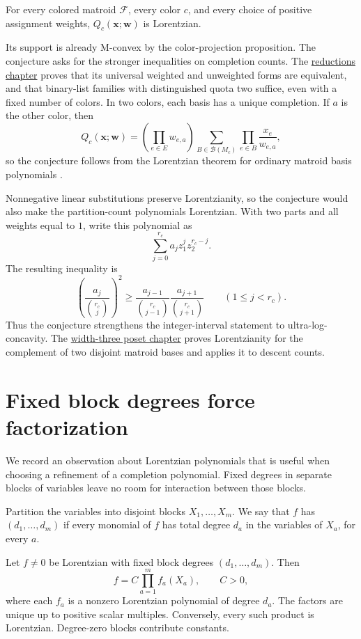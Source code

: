 \begin{conjecture}
For every colored matroid $\mathcal F$, every color $c$, and every choice
of positive assignment weights, $Q_c(\mathbf x;\mathbf w)$ is Lorentzian.
\end{conjecture}

Its support is already M-convex by the color-projection proposition.
The conjecture asks for the stronger inequalities on completion counts.
The \href{reductions.htm}{reductions chapter} proves that its universal
weighted and unweighted forms are equivalent, and that binary-list
families with distinguished quota two suffice, even with a fixed number
of colors.
In two colors, each basis has a unique completion. If $a$ is the other
color, then
\[
 Q_c(\mathbf x;\mathbf w)=
 \left(\prod_{e\in E}w_{e,a}\right)
 \sum_{B\in\mathcal B(M_c)}\prod_{e\in B}\frac{x_e}{w_{e,a}},
\]
so the conjecture follows from the Lorentzian theorem for ordinary
matroid basis polynomials \cite{BrandenHuh2020}.

Nonnegative linear substitutions preserve Lorentzianity, so the conjecture
would also make the partition-count polynomials Lorentzian. With two parts
and all weights equal to $1$, write this polynomial as
\[
 \sum_{j=0}^{r_c}a_j z_1^jz_2^{r_c-j}.
\]
The resulting inequality is
\[
 \left(\frac{a_j}{\binom{r_c}{j}}\right)^2\geq
 \frac{a_{j-1}}{\binom{r_c}{j-1}}
 \frac{a_{j+1}}{\binom{r_c}{j+1}}
 \qquad(1\leq j<r_c).
\]
Thus the conjecture strengthens the integer-interval statement to
ultra-log-concavity. The \href{log-concavity.htm}{width-three poset chapter}
proves Lorentzianity for the complement of two disjoint matroid bases and
applies it to descent counts.

\section[blockFactorization]{Fixed block degrees force factorization}

We record an observation about Lorentzian polynomials that is useful when
choosing a refinement of a completion polynomial. Fixed degrees in separate
blocks of variables leave no room for interaction between those blocks.

Partition the variables into disjoint blocks $X_1,\dotsc,X_m$. We say that
$f$ has  $(d_1,\dotsc,d_m)$ if every monomial
of $f$ has total degree $d_a$ in the variables of $X_a$, for every $a$.

\begin{theorem}
Let $f\ne0$ be Lorentzian with fixed block degrees $(d_1,\dotsc,d_m)$.
Then
\[
 f=C\prod_{a=1}^m f_a(X_a),\qquad C>0,
\]
where each $f_a$ is a nonzero Lorentzian polynomial of degree $d_a$.
The factors are unique up to positive scalar multiples. Conversely, every
such product is Lorentzian. Degree-zero blocks contribute constants.
\end{theorem}

